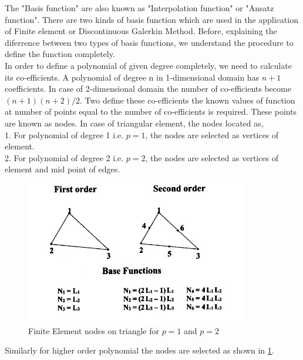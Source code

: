 \documentclass[a4paper,10pt]{book}
\begin{document}
The "Basis function" are also known as "Interpolation function" or "Ansatz function". There are two kinds of basis function which are used in the application of Finite element or Discontinuous Galerkin Method. 
Before, explaining the diferrence between two types of basis functions, we understand the procedure to define the function completely. \\

In order to define a polynomial of given degree completely, we need to calculate its co-efficients. A polynomial of degree n in 1-dimensional domain has $n+1$ coefficients. In case of 2-dimensional domain the number of co-efficients become $(n+1)(n+2)/2$. Two define these co-efficients the known values of function at number of points equal to the number of co-efficients is required. These points are known as nodes. In case of triangular element, the nodes located as,\\

1. For polynomial of degree 1 i.e. $p=1$, the nodes are selected as vertices of element.\\
2. For polynomial of degree 2 i.e. $p=2$, the nodes are selected as vertices of element and mid point of edges.\\

\begin{figure}
  \includegraphics[width=\linewidth]{fem_triangle.jpg}
  \caption{Finite Element nodes on triangle for $p=1$ and $p=2$ \cite{plasma}}
  \label{fig:Nodes on Triangular Element}
\end{figure}

Similarly for higher order polynomial the nodes are selected as shown in \ref{fig:Nodes on Triangular Element}.
\end{document}
